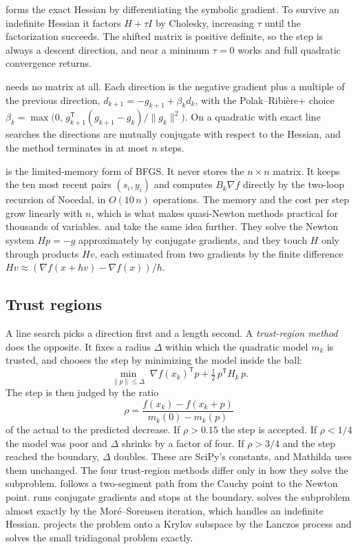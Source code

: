  forms the exact Hessian by differentiating the symbolic
gradient. To survive an indefinite Hessian it factors \(H + \tau I\) by
Cholesky, increasing \(\tau\) until the factorization succeeds. The shifted
matrix is positive definite, so the step is always a descent direction, and
near a minimum \(\tau = 0\) works and full quadratic convergence returns.

 needs no matrix at all. Each direction is the
negative gradient plus a multiple of the previous direction,
\(d_{k+1} = -g_{k+1} + \beta_k d_k\), with the Polak--Ribi\`ere+ choice
\(\beta_k = \max\bigl(0,\, g_{k+1}^{\mathsf T}(g_{k+1} - g_k)/\|g_k\|^2\bigr)\).
On a quadratic with exact line searches the directions are mutually conjugate
with respect to the Hessian, and the method terminates in at most \(n\) steps.

 is the limited-memory form of BFGS. It never stores the
\(n\times n\) matrix. It keeps the ten most recent pairs \((s_i, y_i)\) and
computes \(B_k \nabla f\) directly by the two-loop recursion of Nocedal, in
\(O(10\,n)\) operations. The memory and the cost per step grow linearly with
\(n\), which is what makes quasi-Newton methods practical for thousands of
variables.  and  take the same idea further.
They solve the Newton system \(H p = -g\) approximately by conjugate
gradients, and they touch \(H\) only through products \(Hv\), each estimated
from two gradients by the finite difference
\(Hv \approx (\nabla f(x + hv) - \nabla f(x))/h\).

\subsection{Trust regions}

A line search picks a direction first and a length second. A \emph{trust-region
method} does the opposite. It fixes a radius
\(\Delta\) within which the quadratic model \(m_k\) is trusted, and chooses the
step by minimizing the model inside the ball:
\[
  \min_{\|p\| \le \Delta}\; \nabla f(x_k)^{\mathsf T} p + \tfrac12\, p^{\mathsf T} H_k\, p .
\]
The step is then judged by the ratio
\[
  \rho = \frac{f(x_k) - f(x_k + p)}{m_k(0) - m_k(p)}
\]
of the actual to the predicted decrease. If \(\rho > 0.15\) the step is
accepted. If \(\rho < 1/4\) the model was poor and \(\Delta\) shrinks by a
factor of four. If \(\rho > 3/4\) and the step reached the boundary,
\(\Delta\) doubles. These are SciPy's constants, and Mathilda uses them
unchanged. The four trust-region methods differ only in how they solve the
subproblem.  follows a two-segment path from the Cauchy point
to the Newton point.  runs conjugate gradients and stops at
the boundary.  solves the subproblem almost exactly by the
Mor\'e--Sorensen iteration, which handles an indefinite Hessian.
 projects the problem onto a Krylov subspace by the
Lanczos process and solves the small tridiagonal problem exactly.

